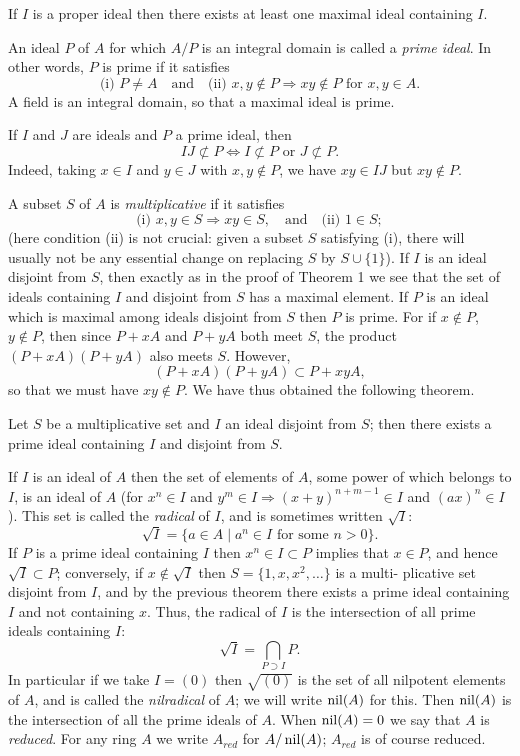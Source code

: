 \begin{theorem}\label{thm:1.1}
If $I$ is a proper ideal then there exists at least one maximal ideal
containing $I$.
\end{theorem}

An ideal $P$ of $A$ for which $A/P$ is an integral domain is called a \emph{prime ideal}.
In other words, $P$ is prime if it satisfies
\[
  \text{(i) } P \neq A \quad \text{and} \quad \text{(ii) } x, y \notin P \Rightarrow xy \notin P \text{ for } x, y \in A.
\]
A field is an integral domain, so that a maximal ideal is prime.

If $I$ and $J$ are ideals and $P$ a prime ideal, then
\[
  IJ \not\subset P \iff I \not\subset P \text{ or } J \not\subset P.
\]
Indeed, taking $x \in I$ and $y \in J$ with $x, y \notin P$, we have $xy \in IJ$ but $xy \notin P$.

A subset $S$ of $A$ is \emph{multiplicative} if it satisfies
\[
  \text{(i) } x, y \in S \Rightarrow xy \in S, \quad \text{and} \quad \text{(ii) } 1 \in S;
\]
(here condition (ii) is not crucial: given a subset $S$ satisfying (i), there will
usually not be any essential change on replacing $S$ by $S \cup \{1\}$). If $I$ is
an ideal disjoint from $S$, then exactly as in the proof of Theorem 1 we see
that the set of ideals containing $I$ and disjoint from $S$ has a maximal
element. If $P$ is an ideal which is maximal among ideals disjoint from $S$
then $P$ is prime. For if $x \notin P$, $y \notin P$, then since $P + xA$ and $P + yA$ both
meet $S$, the product $(P + xA)(P + yA)$ also meets $S$. However,
\[
  (P + xA)(P + yA) \subset P + xyA,
\]
so that we must have $xy \notin P$. We have thus obtained the following theorem.

\begin{theorem}\label{thm:1.2}
Let $S$ be a multiplicative set and $I$ an ideal disjoint from $S$;
then there exists a prime ideal containing $I$ and disjoint from $S$.
\end{theorem}

If $I$ is an ideal of $A$ then the set of elements of $A$, some power of which
belongs to $I$, is an ideal of $A$ (for $x^n \in I$ and $y^m \in I \Rightarrow (x + y)^{n+m-1} \in I$
and $(ax)^n \in I$). This set is called the \emph{radical} of $I$, and is sometimes written $\sqrt{I}$:
\[
  \sqrt{I} = \{a \in A \mid a^n \in I \text{ for some } n > 0\}.
\]
If $P$ is a prime ideal containing $I$ then $x^n \in I \subset P$ implies that $x \in P$, and
hence $\sqrt{I} \subset P$; conversely, if $x \notin \sqrt{I}$ then $S = \{1, x, x^2, \ldots\}$ is a multi-
plicative set disjoint from $I$, and by the previous theorem there exists a
prime ideal containing $I$ and not containing $x$. Thus, the radical of $I$ is
the intersection of all prime ideals containing $I$:
\[
  \sqrt{I} = \bigcap_{P \supset I} P.
\]
In particular if we take $I = (0)$ then $\sqrt{(0)}$ is the set of all nilpotent elements
of $A$, and is called the \emph{nilradical} of $A$; we will write $\operatorname{nil}(A)$ for this. Then
$\operatorname{nil}(A)$ is the intersection of all the prime ideals of $A$. When $\operatorname{nil}(A) = 0$ we say
that $A$ is \emph{reduced}. For any ring $A$ we write $A_{red}$ for $A/\operatorname{nil}(A)$; $A_{red}$ is of
course reduced.

